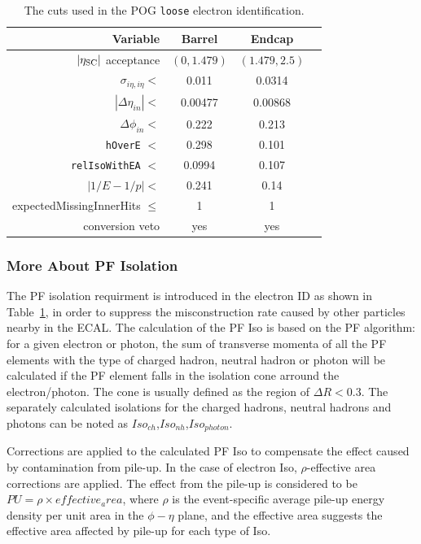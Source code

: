 \begin{table}[htb!]
  \center
  \caption{The cuts used in the POG \texttt{loose} electron identification.}
  \label{tab:electron-id}
  \begin{tabular}{r c c c}
    \hline
    Variable & Barrel & Endcap \\
    \hline
    $|\eta_{\rm SC}|$ acceptance & $(0, 1.479)$ & $(1.479, 2.5)$\\
    $\sigma_{i\eta,i\eta} <$ & 0.011  & 0.0314 \\
    $|\Delta\eta_{in}| <$ & 0.00477  & 0.00868 \\
    $\Delta\phi_{in} <$ & 0.222  & 0.213 \\
    \texttt{hOverE} $<$ & 0.298  & 0.101 \\
    \texttt{relIsoWithEA} $<$ & 0.0994  & 0.107 \\
    $|1/E - 1/p| <$ & 0.241  & 0.14 \\
    expectedMissingInnerHits $\leq$ & 1  & 1 \\
    conversion veto & yes  & yes \\
    \hline
  \end{tabular}
\end{table}

\subsubsection{More About PF Isolation}
The PF isolation requirment is introduced in the electron ID as shown in Table~\ref{tab:electron-id}, in order to suppress the misconstruction rate caused by other particles nearby in the ECAL. The calculation of the PF Iso is based on the PF algorithm: for a given electron or photon, the sum of transverse momenta of all the PF elements with the type of charged hadron, neutral hadron or photon will be calculated if the PF element falls in the isolation cone arround the electron/photon. The cone is usually defined as the region of $\Delta R<0.3$. The separately calculated isolations for the charged hadrons, neutral hadrons and photons can be noted as $Iso_{ch}$,$Iso_{nh}$,$Iso_{photon}$.

\vspace{0.3cm}
Corrections are applied to the calculated PF Iso to compensate the effect caused by contamination from pile-up. In the case of electron Iso, $\rho$-effective area corrections are applied. The effect from the pile-up is considered to be $PU= \rho \times effective_area$, where $\rho$ is the event-specific average pile-up energy density per unit area in the $\phi-\eta$ plane, and the effective area suggests the effective area affected by pile-up for each type of Iso. 

